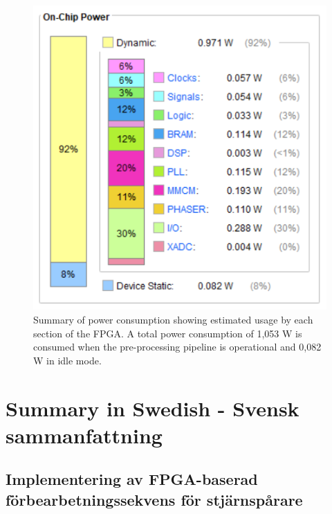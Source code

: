 \documentclass[12pt]{report}
\begin{document}
\begin{figure}[h]
    \centering
    \includegraphics[scale=0.9]{figures/power_report.PNG}
    \caption{Summary of power consumption showing estimated usage by each section of the FPGA. A total power consumption of 1,053 W is consumed when the pre-processing pipeline is operational and 0,082 W in idle mode.}
    \label{fig:fpga_power}
\end{figure}


\chapter{Summary in Swedish - Svensk sammanfattning}
\section*{Implementering av FPGA-baserad förbearbetningssekvens för stjärnspårare}
\end{document}
